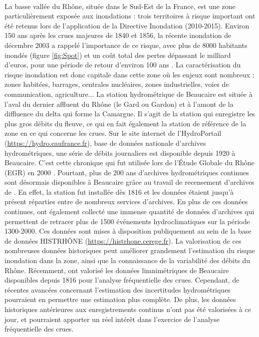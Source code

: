 	\paragraph{} La basse vallée du Rhône, située dans le Sud-Est de la France, est une zone particulièrement exposée aux inondations : trois territoires à risque important ont été retenus lors de l'application de la Directive Inondation (2010-2015). Environ 150 ans après les crues majeures de 1840 et 1856, la récente inondation de décembre 2003 a rappelé l'importance de ce risque, avec plus de 8000 habitants inondés (figure \ref{fig:Spot}) et un coût total des pertes dépassant le milliard d'euros, pour une période de retour d'environ 100 ans \citep{medd_debit_2005}. La caractérisation du risque inondation est donc capitale dans cette zone où les enjeux sont nombreux : zones habitées, barrages, centrales nucléaires, zones industrielles, voies de communication, agriculture... La station hydrométrique de Beaucaire est située à l'aval du dernier affluent du Rhône (le Gard ou Gardon) et à l'amont de la diffluence du delta qui forme la Camargue. Il s'agit de la station qui enregistre les plus gros débits du fleuve, ce qui en fait également la station de référence de la zone en ce qui concerne les crues. Sur le site internet de l'HydroPortail (\url{https://hydro.eaufrance.fr}), base de données nationale d'archives hydrométriques, une série de débits journaliers est disponible depuis 1920 à Beaucaire. C'est cette chronique qui fut utilisée lors de l'Étude Globale du Rhône (EGR) en 2000 \citep{rigaudiere_etude_2000}. Pourtant, plus de 200 ans d'archives hydrométriques continues sont désormais disponibles à Beaucaire grâce au travail de recensement d'archives de \citet{pichard_sept_2014}. En effet, la station fut installée dès 1816 et les données étaient jusqu'à présent réparties entre de nombreux services d'archives. En plus de ces données continues, \citet{pichard_sept_2014} ont également collecté une immense quantité de données d'archives qui permettent de retracer plus de 1500 événements hydroclimatiques sur la période 1300-2000. Ces données sont mises à disposition publiquement au sein de la base de données HISTRHÔNE (\url{https://histrhone.cerege.fr}). La valorisation de ces nombreuses données historiques peut améliorer grandement l'estimation du risque inondation dans la zone, ainsi que la connaissance de la variabilité des débits du Rhône. Récemment, \citet{bard_actualisation_2018} ont valorisé les données limnimétriques de Beaucaire disponibles depuis 1816 pour l'analyse fréquentielle des crues. Cependant, de récentes avancées concernant l'estimation des incertitudes hydrométriques pourraient en permettre une estimation plus complète. De plus, les données historiques antérieures aux enregistrements continus n'ont pas été valorisées à ce jour, et pourraient apporter un réel intérêt dans l'exercice de l'analyse fréquentielle des crues. 
	

